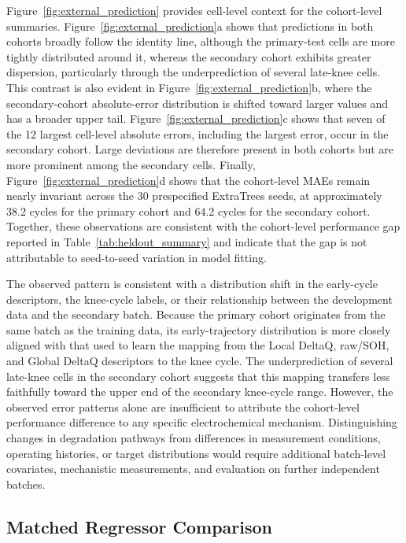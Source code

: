\documentclass[pdflatex,sn-mathphys-num]{sn-jnl}
\begin{document}
Figure~\ref{fig:external_prediction} provides cell-level context for the cohort-level summaries. Figure~\ref{fig:external_prediction}a shows that predictions in both cohorts broadly follow the identity line, although the primary-test cells are more tightly distributed around it, whereas the secondary cohort exhibits greater dispersion, particularly through the underprediction of several late-knee cells. This contrast is also evident in Figure~\ref{fig:external_prediction}b, where the secondary-cohort absolute-error distribution is shifted toward larger values and has a broader upper tail. Figure~\ref{fig:external_prediction}c shows that seven of the 12 largest cell-level absolute errors, including the largest error, occur in the secondary cohort. Large deviations are therefore present in both cohorts but are more prominent among the secondary cells. Finally, Figure~\ref{fig:external_prediction}d shows that the cohort-level MAEs remain nearly invariant across the 30 prespecified ExtraTrees seeds, at approximately 38.2 cycles for the primary cohort and 64.2 cycles for the secondary cohort. Together, these observations are consistent with the cohort-level performance gap reported in Table~\ref{tab:heldout_summary} and indicate that the gap is not attributable to seed-to-seed variation in model fitting.

The observed pattern is consistent with a distribution shift in the early-cycle descriptors, the knee-cycle labels, or their relationship between the development data and the secondary batch. Because the primary cohort originates from the same batch as the training data, its early-trajectory distribution is more closely aligned with that used to learn the mapping from the Local DeltaQ, raw/SOH, and Global DeltaQ descriptors to the knee cycle. The underprediction of several late-knee cells in the secondary cohort suggests that this mapping transfers less faithfully toward the upper end of the secondary knee-cycle range. However, the observed error patterns alone are insufficient to attribute the cohort-level performance difference to any specific electrochemical mechanism. Distinguishing changes in degradation pathways from differences in measurement conditions, operating histories, or target distributions would require additional batch-level covariates, mechanistic measurements, and evaluation on further independent batches.

\FloatBarrier

\subsection{Matched Regressor Comparison}\label{subsec:regressor_comparison}
\end{document}
